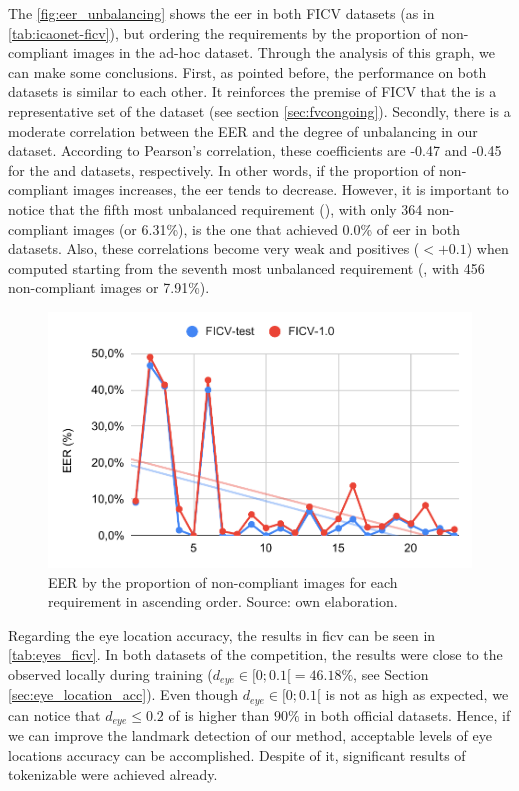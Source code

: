 The \autoref{fig:eer_unbalancing} shows the \acs{eer} in both FICV datasets (as in \autoref{tab:icaonet-ficv}), but ordering the requirements by the proportion of non-compliant images in the ad-hoc dataset. Through the analysis of this graph, we can make some conclusions. First, as pointed before, the performance on both datasets is similar to each other. It reinforces the premise of FICV that the \ficvtest is a representative set of the \ficvofficial dataset (see section \ref{sec:fvcongoing}). Secondly, there is a moderate correlation between the EER and the degree of unbalancing in our dataset. According to Pearson's correlation, these coefficients are -0.47 and -0.45 for the \ficvtest and \ficvofficial datasets, respectively. In other words, if the proportion of non-compliant images increases, the \acs{eer} tends to decrease. However, it is important to notice that the fifth most unbalanced requirement (\veiloverface), with only 364 non-compliant images (or 6.31\%), is the one that achieved 0.0\% of \acs{eer} in both datasets. Also, these correlations become very weak and positives ($< +0.1$) when computed starting from the seventh most unbalanced requirement (\toodarklight, with 456 non-compliant images or 7.91\%).

\begin{figure}[ht]
\centering
\includegraphics[width=0.8\linewidth]{images/graphs/eer_unbalancing.pdf}
\caption{EER by the proportion of non-compliant images for each requirement in ascending order. Source: own elaboration.}
\label{fig:eer_unbalancing}
\end{figure}

Regarding the eye location accuracy, the results in \acs{ficv} can be seen in \autoref{tab:eyes_ficv}. In both datasets of the competition, the results were close to the observed locally during training ($d_{eye} \in [0;0.1[ = 46.18\%$, see Section \ref{sec:eye_location_acc}). Even though $d_{eye} \in [0;0.1[$ is not as high as expected, we can notice that $d_{eye} \leq 0.2$ of \methodname is higher than $90\%$ in both official datasets. Hence, if we can improve the landmark detection of our method, acceptable levels of eye locations accuracy can be accomplished. Despite of it, significant results of tokenizable were achieved already.

